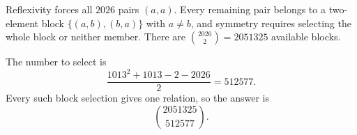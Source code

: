 Reflexivity forces all $2026$ pairs $(a,a)$. Every remaining pair belongs to a two-element block $\{(a,b),(b,a)\}$ with $a\ne b$, and symmetry requires selecting the whole block or neither member. There are $\binom{2026}{2}=2051325$ available blocks.

The number to select is
\[
\dfrac{1013^2+1013-2-2026}{2}=512577.
\]
Every such block selection gives one relation, so the answer is
\[
\boxed{\binom{2051325}{512577}}.
\]
